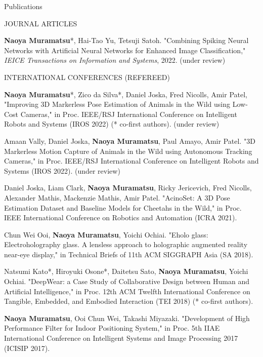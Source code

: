 \documentclass{resume} %
\begin{document}

\begin{rSection}{Publications} \itemsep 4pt


    \begin{rSubsection}{JOURNAL ARTICLES}{}{}{}{}
        \item \textbf{Naoya Muramatsu}*, Hai-Tao Yu, Tetsuji Satoh. "Combining Spiking Neural Networks with Artificial Neural Networks for Enhanced Image Classification," \textit{IEICE Transactions on Information and Systems}, 2022. (under review)
    \end{rSubsection}

    \begin{rSubsection}{INTERNATIONAL CONFERENCES (REFEREED)}{}{}{}{}
        \item \textbf{Naoya Muramatsu}*, Zico da Silva*, Daniel Joska, Fred Nicolls, Amir Patel, "Improving 3D Markerless Pose Estimation of Animals in the Wild using Low-Cost Cameras," in Proc. IEEE/RSJ International Conference on Intelligent Robots and Systems (IROS 2022) (* co-first authors). (under review)
        \item Amaan Vally, Daniel Joska, \textbf{Naoya Muramatsu}, Paul Amayo, Amir Patel. "3D Markerless Motion Capture of Animals in the Wild using Autonomous Tracking Cameras," in Proc. IEEE/RSJ International Conference on Intelligent Robots and Systems (IROS 2022). (under review)
        \item Daniel Joska, Liam Clark, \textbf{Naoya Muramatsu}, Ricky Jericevich, Fred Nicolls, Alexander Mathis, Mackenzie Mathis, Amir Patel. "AcinoSet: A 3D Pose Estimation Dataset and Baseline Models for Cheetahs in the Wild," in Proc. IEEE International Conference on Robotics and Automation (ICRA 2021).
        \item Chun Wei Ooi, \textbf{Naoya Muramatsu}, Yoichi Ochiai. "Eholo glass: Electroholography glass. A lensless approach to holographic augmented reality near-eye display," in Technical Briefs of 11th ACM SIGGRAPH Asia (SA 2018).
        \item Natsumi Kato*, Hiroyuki Osone*, Daitetsu Sato, \textbf{Naoya Muramatsu}, Yoichi Ochiai. "DeepWear: a Case Study of Collaborative Design between Human and Artificial Intelligence,"  in Proc. 12th ACM Twelfth International Conference on Tangible, Embedded, and Embodied Interaction (TEI 2018) (* co-first authors).
        \item \textbf{Naoya Muramatsu}, Ooi Chun Wei, Takashi Miyazaki. "Development of High Performance Filter for Indoor Positioning System," in Proc. 5th IIAE International Conference on Intelligent Systems and Image Processing 2017 (ICISIP 2017).
    \end{rSubsection}


\end{rSection}
\end{document}
